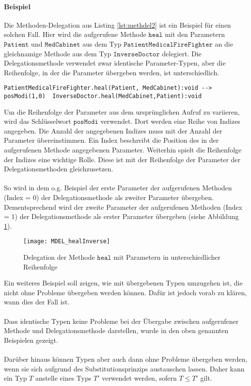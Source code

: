 \paragraph{Beispiel} Die Methoden-Delegation aus Listing \ref{lst:methdel2} ist ein Beispiel für einen solchen Fall. Hier wird die aufgerufene Methode $\texttt{heal}$ mit den Parametern $\texttt{Patient}$ und $\texttt{MedCabinet}$ aus dem Typ $\texttt{PatientMedicalFireFighter}$ an die gleichnamige Methode aus dem Typ $\texttt{InverseDoctor}$ delegiert. Die Delegationsmethode verwendet zwar identische Parameter-Typen, aber die Reihenfolge, in der die Parameter übergeben werden, ist unterschiedlich.
\begin{lstlisting}[style = dsl, caption = Methoden-Delegation mit Parametern in unterschiedlicher Reihenfolge, captionpos = b]
	PatientMedicalFireFighter.heal(Patient, MedCabinet):void --> posModi(1,0)  InverseDoctor.heal(MedCabinet,Patient):void
\end{lstlisting}\label{lst:methdel2}
\noindent
Um die Reihenfolge der Parameter aus dem ursprünglichen Aufruf zu variieren, wird das Schlüsselwort $\texttt{posModi}$ verwendet. Dort werden eine Reihe von Indizes angegeben. Die Anzahl der angegebenen Indizes muss mit der Anzahl der Parameter übereinstimmen. Ein Index beschreibt die Position des in der aufgerufenen Methode angegebenen Parameter. Weiterhin spielt die Reihenfolge der Indizes eine wichtige Rolle. Diese ist mit der Reihenfolge der Parameter der Delegationsmethoden gleichzusetzen.
\\\\
So wird in dem o.g. Beispiel der erste Parameter der aufgerufenen Methoden (Index = 0) der Delegationsmethode als zweiter Parameter übergeben. Dementsprechend wird der zweite Parameter der aufgerufenen Methoden (Index = 1) der Delegationsmethode als erster Parameter übergeben (siehe Abbildung \ref{fig:DEL_healInverse}). 
\begin{figure}[H]
\texttt{[image: MDEL\_healInverse]}
\caption{Delegation der Methode $\texttt{heal}$ mit Parametern in unterschiedlicher Reihenfolge}
\label{fig:DEL_healInverse}
\end{figure}
\noindent
Ein weiteres Beispiel soll zeigen, wie mit übergebenen Typen umzugehen ist, die nicht ohne Probleme übergeben werden können. Dafür ist jedoch vorab zu klären, wann dies der Fall ist.
\\\\
Dass identische Typen keine Probleme bei der Übergabe zwischen aufgerufener Methode und Delegationsmethode darstellen, wurde in den oben genannten Beispielen gezeigt.\\\\
Darüber hinaus können Typen aber auch dann ohne Probleme übergeben werden, wenn sie sich aufgrund des Substitutionsprinzips austauschen lassen. Daher kann ein Typ $T$ anstelle eines Typs $T'$ verwendet werden, sofern $T \leq T'$ gilt.
